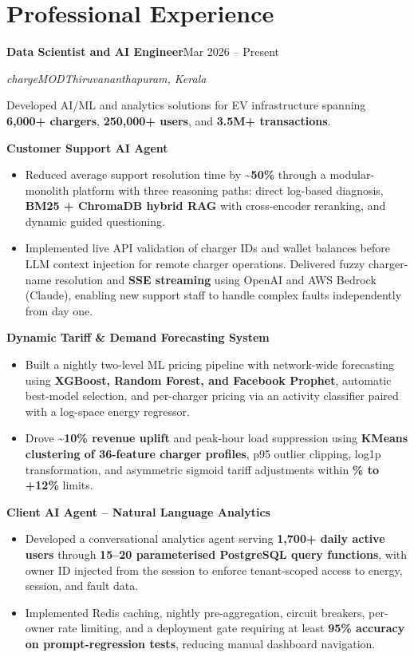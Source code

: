 \documentclass[11pt,letterpaper]{article}
\newcommand{\ChargeMODTitle}{Data Scientist and AI Engineer}
\newcommand{\ChargeMODDates}{Mar 2026 -- Present}
\newcommand{\role}[4]{%
    \vspace{2pt}\noindent\textbf{#1}\hfill #2\par
    \textit{#3}\hfill\textit{#4}\par\vspace{1pt}%
}
\newcommand{\project}[1]{%
    \vspace{2pt}\noindent\textbf{#1}\par\nobreak
}
\newcommand{\about}{\textasciitilde{}}
\begin{document}
\section{Professional Experience}
\role{\ChargeMODTitle}{\ChargeMODDates}{chargeMOD}{Thiruvananthapuram, Kerala}
Developed AI/ML and analytics solutions for EV infrastructure spanning \textbf{6,000+ chargers}, \textbf{250,000+ users}, and \textbf{3.5M+ transactions}.

\project{Customer Support AI Agent}
\begin{itemize}
    \item Reduced average support resolution time by \textbf{\about50\%} through a modular-monolith platform with three reasoning paths: direct log-based diagnosis, \textbf{BM25 + ChromaDB hybrid RAG} with cross-encoder reranking, and dynamic guided questioning.
    \item Implemented live API validation of charger IDs and wallet balances before LLM context injection for remote charger operations. Delivered fuzzy charger-name resolution and \textbf{SSE streaming} using OpenAI and AWS Bedrock (Claude), enabling new support staff to handle complex faults independently from day one.
\end{itemize}

\project{Dynamic Tariff \& Demand Forecasting System}
\begin{itemize}
    \item Built a nightly two-level ML pricing pipeline with network-wide forecasting using \textbf{XGBoost, Random Forest, and Facebook Prophet}, automatic best-model selection, and per-charger pricing via an activity classifier paired with a log-space energy regressor.
    \item Drove \textbf{\about10\% revenue uplift} and peak-hour load suppression using \textbf{KMeans clustering of 36-feature charger profiles}, p95 outlier clipping, log1p transformation, and asymmetric sigmoid tariff adjustments within \textbf{\% to +12\%} limits.
\end{itemize}

\project{Client AI Agent -- Natural Language Analytics}
\begin{itemize}
    \item Developed a conversational analytics agent serving \textbf{1,700+ daily active users} through \textbf{15--20 parameterised PostgreSQL query functions}, with owner ID injected from the session to enforce tenant-scoped access to energy, session, and fault data.
    \item Implemented Redis caching, nightly pre-aggregation, circuit breakers, per-owner rate limiting, and a deployment gate requiring at least \textbf{95\% accuracy on prompt-regression tests}, reducing manual dashboard navigation.
\end{itemize}
\end{document}

